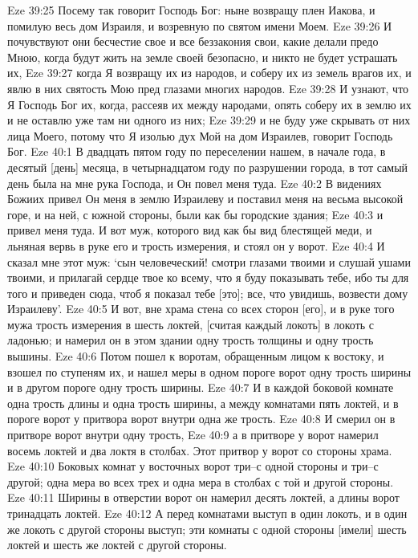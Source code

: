 Eze 39:25  Посему так говорит Господь Бог: ныне возвращу плен Иакова, и помилую весь дом Израиля, и возревную по святом имени Моем.
Eze 39:26  И почувствуют они бесчестие свое и все беззакония свои, какие делали предо Мною, когда будут жить на земле своей безопасно, и никто не будет устрашать их,
Eze 39:27  когда Я возвращу их из народов, и соберу их из земель врагов их, и явлю в них святость Мою пред глазами многих народов.
Eze 39:28  И узнают, что Я Господь Бог их, когда, рассеяв их между народами, опять соберу их в землю их и не оставлю уже там ни одного из них;
Eze 39:29  и не буду уже скрывать от них лица Моего, потому что Я изолью дух Мой на дом Израилев, говорит Господь Бог.
Eze 40:1  В двадцать пятом году по переселении нашем, в начале года, в десятый [день] месяца, в четырнадцатом году по разрушении города, в тот самый день была на мне рука Господа, и Он повел меня туда.
Eze 40:2  В видениях Божиих привел Он меня в землю Израилеву и поставил меня на весьма высокой горе, и на ней, с южной стороны, были как бы городские здания;
Eze 40:3  и привел меня туда. И вот муж, которого вид как бы вид блестящей меди, и льняная вервь в руке его и трость измерения, и стоял он у ворот.
Eze 40:4  И сказал мне этот муж: `сын человеческий! смотри глазами твоими и слушай ушами твоими, и прилагай сердце твое ко всему, что я буду показывать тебе, ибо ты для того и приведен сюда, чтоб я показал тебе [это]; все, что увидишь, возвести дому Израилеву'.
Eze 40:5  И вот, вне храма стена со всех сторон [его], и в руке того мужа трость измерения в шесть локтей, [считая каждый локоть] в локоть с ладонью; и намерил он в этом здании одну трость толщины и одну трость вышины.
Eze 40:6  Потом пошел к воротам, обращенным лицом к востоку, и взошел по ступеням их, и нашел меры в одном пороге ворот одну трость ширины и в другом пороге одну трость ширины.
Eze 40:7  И в каждой боковой комнате одна трость длины и одна трость ширины, а между комнатами пять локтей, и в пороге ворот у притвора ворот внутри одна же трость.
Eze 40:8  И смерил он в притворе ворот внутри одну трость,
Eze 40:9  а в притворе у ворот намерил восемь локтей и два локтя в столбах. Этот притвор у ворот со стороны храма.
Eze 40:10  Боковых комнат у восточных ворот три--с одной стороны и три--с другой; одна мера во всех трех и одна мера в столбах с той и другой стороны.
Eze 40:11  Ширины в отверстии ворот он намерил десять локтей, а длины ворот тринадцать локтей.
Eze 40:12  А перед комнатами выступ в один локоть, и в один же локоть с другой стороны выступ; эти комнаты с одной стороны [имели] шесть локтей и шесть же локтей с другой стороны.
